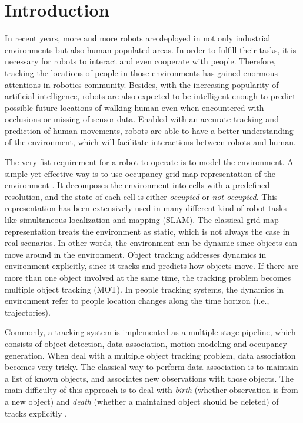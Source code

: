 \chapter{Introduction}

In recent years, more and more robots are deployed in not only industrial environments but also human populated areas. In order to fulfill their tasks, it is necessary for robots to interact and even cooperate with people. Therefore, tracking the locations of people in those environments has gained enormous attentions in robotics community. Besides, with the increasing popularity of artificial intelligence, robots are also expected to be intelligent enough to predict possible future locations of walking human even when encountered with occlusions or missing of sensor data. Enabled with an accurate tracking and prediction of human movements, robots are able to have a better understanding of the environment, which will facilitate interactions between robots and human.

The very fist requirement for a robot to operate is to model the environment. A simple yet effective way is to use occupancy grid map representation of the environment \citep{moravec1985high}. It decomposes the environment into cells with a predefined resolution, and the state of each cell is either \textit{occupied} or \textit{not occupied}. This representation has been extensively used in many different kind of robot tasks like simultaneous localization and mapping (SLAM). The classical grid map representation treats the environment as static, which is not always the case in real scenarios. In other words, the environment can be dynamic since objects can move around in the environment. Object tracking addresses dynamics in environment explicitly, since it tracks and predicts how objects move. If there are more than one object involved at the same time, the tracking problem becomes multiple object tracking (MOT). In people tracking systems, the dynamics in environment refer to people location changes along the time horizon (i.e., trajectories). 

Commonly, a tracking system is implemented as a multiple stage pipeline, which consists of object detection, data association, motion modeling and occupancy generation. When deal with a multiple object tracking problem, data association becomes very tricky. The classical way to perform data association is to maintain a list of known objects, and associates new observations with those objects. The main difficulty of this approach is to deal with \textit{birth} (whether observation is from a new object) and \textit{death} (whether a maintained object should be deleted) of tracks explicitly \citep{gauvrit1997formulation}. 

